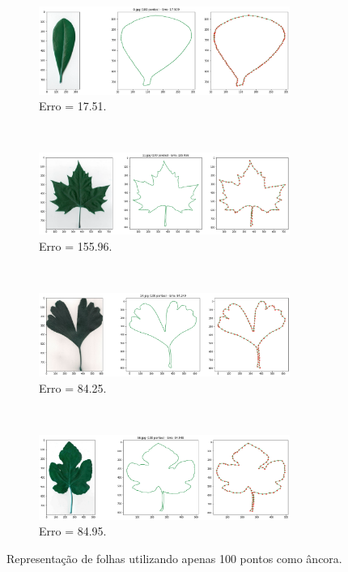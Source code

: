 \begin{figure}[H]
	\centering
	\begin{subfigure}[b]{\textwidth}
		\centering
		\includegraphics[width=0.9\textwidth]{img/res/0_100.png}
		\caption{Erro = 17.51.}
	\end{subfigure}
	\\
	\begin{subfigure}[b]{\textwidth}
		\centering
		\includegraphics[width=0.9\textwidth]{img/res/1_100.png}
		\caption{Erro = 155.96.}
	\end{subfigure}
	\\
	\begin{subfigure}[b]{\textwidth}
		\centering
		\includegraphics[width=0.9\textwidth]{img/res/2_100.png}
		\caption{Erro = 84.25.}
	\end{subfigure}
	\\
	\begin{subfigure}[b]{\textwidth}
		\centering
		\includegraphics[width=0.9\textwidth]{img/res/3_100.png}
		\caption{Erro = 84.95.}
	\end{subfigure}
	\caption{Representação de folhas utilizando apenas 100 pontos como âncora.}
	\label{fig:folha3rep}
\end{figure}

